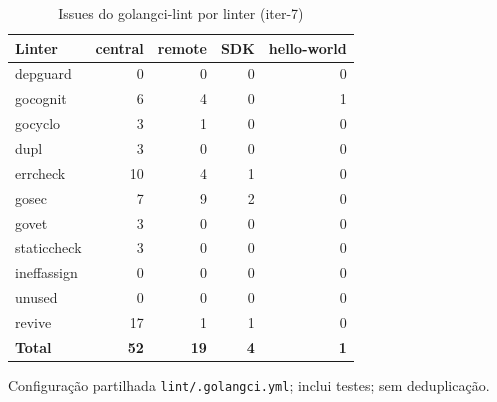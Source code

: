 \begin{table}[htbp]
  \centering\small
  \caption{Issues do golangci-lint por linter (iter-7)}
  \label{tab:iter-7-lint}
  \begin{tabular}{lrrrr}
    \toprule
    Linter & central & remote & SDK & hello-world \\
    \midrule
    depguard & 0 & 0 & 0 & 0 \\
    gocognit & 6 & 4 & 0 & 1 \\
    gocyclo & 3 & 1 & 0 & 0 \\
    dupl & 3 & 0 & 0 & 0 \\
    errcheck & 10 & 4 & 1 & 0 \\
    gosec & 7 & 9 & 2 & 0 \\
    govet & 3 & 0 & 0 & 0 \\
    staticcheck & 3 & 0 & 0 & 0 \\
    ineffassign & 0 & 0 & 0 & 0 \\
    unused & 0 & 0 & 0 & 0 \\
    revive & 17 & 1 & 1 & 0 \\
    \textbf{Total} & \textbf{52} & \textbf{19} & \textbf{4} & \textbf{1} \\
    \bottomrule
  \end{tabular}
  \par\smallskip\footnotesize Configuração partilhada \texttt{lint/.golangci.yml}; inclui testes; sem deduplicação.
\end{table}
